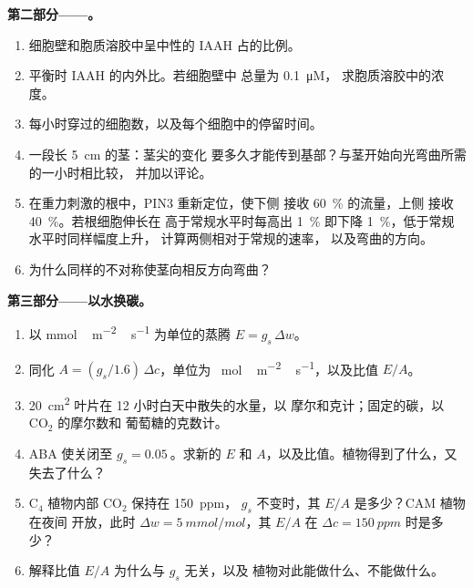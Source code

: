 \begin{problem}
\medskip
\noindent\textbf{第二部分——。}
\begin{enumerate}[resume]
  \item 细胞壁和胞质溶胶中呈中性的 IAAH
        占的比例。
  \item 平衡时 IAAH 的内外比。若细胞壁中
        总量为 \qty{0.1}{\micro M}，
        求胞质溶胶中的浓度。
  \item 每小时穿过的细胞数，以及每个细胞中的停留时间。
  \item 一段长 \qty{5}{cm} 的茎：茎尖的变化
        要多久才能传到基部？与茎开始向光弯曲所需的一小时相比较，
        并加以评论。
  \item 在重力刺激的根中，PIN3 重新定位，使下侧
        接收 \qty{60}{\%} 的流量，上侧
        接收 \qty{40}{\%}。若根细胞伸长在
        高于常规水平时每高出 \qty{1}{\%} 即下降 \qty{1}{\%}，低于常规水平时同样幅度上升，
        计算两侧相对于常规的速率，
        以及弯曲的方向。
  \item 为什么同样的不对称使茎向相反方向弯曲？
\end{enumerate}

\medskip
\noindent\textbf{第三部分——以水换碳。}
\begin{enumerate}[resume]
  \item 以 \unit{mmol\,m^{-2}\,s^{-1}} 为单位的蒸腾 $E = g_{s}\,\Delta w$。
  \item 同化 $A = (g_{s}/1.6)\,\Delta c$，单位为 \unit{\micro
        mol\,m^{-2}\,s^{-1}}，以及比值 $E/A$。
  \item \qty{20}{cm^2} 叶片在 12 小时白天中散失的水量，以
        摩尔和克计；固定的碳，以 CO$_{2}$ 的摩尔数和
        葡萄糖的克数计。
  \item ABA 使关闭至 $g_{s} = \qty{0.05}{}$。求新的 $E$ 和
        $A$，以及比值。植物得到了什么，又失去了什么？
  \item C$_{4}$ 植物内部 CO$_{2}$ 保持在 \qty{150}{ppm}，
        $g_{s}$ 不变时，其 $E/A$ 是多少？CAM 植物在夜间
        开放，此时 $\Delta w = \qty{5}{mmol/mol}$，其 $E/A$ 在 $\Delta c =
        \qty{150}{ppm}$ 时是多少？
  \item 解释比值 $E/A$ 为什么与 $g_{s}$ 无关，以及
        植物对此能做什么、不能做什么。
\end{enumerate}


\end{problem}
